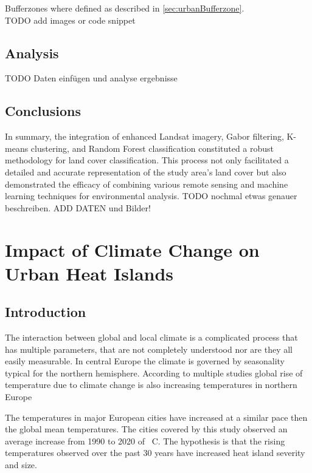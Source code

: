 \documentclass[12pt,a4paper, english,twoside]{article}
\begin{document}
    Bufferzones where defined as described in \cref{sec:urbanBufferzone}. \\
    TODO add images or code snippet



 \subsection{Analysis}\label{sec:landcoverAnalysis}
TODO Daten einfügen und analyse ergebnisse
  \subsection{Conclusions}
In summary, the integration of enhanced Landsat imagery, Gabor filtering, K-means clustering, and Random Forest classification constituted a robust methodology for land cover classification.
This process not only facilitated a detailed and accurate representation of the study area's land cover but also demonstrated the efficacy of combining various remote sensing and machine learning techniques for environmental analysis.
TODO nochmal etwas genauer beschreiben. ADD DATEN und Bilder! 
%
\newpage
  \section{Impact of Climate Change on Urban Heat Islands}\label{sec:UHITempImp}
    \subsection{Introduction}
    The interaction between global and local climate is a complicated process that has multiple parameters, that are not completely understood nor are they all easily measurable. 
    In central Europe the climate is governed by seasonality typical for the northern hemisphere.  
    According to multiple studies global rise of temperature due to climate change is also increasing temperatures in northern Europe~\cite{Benestad2005}  %

    The temperatures in major European cities have increased at a similar pace then the global mean temperatures. 
    The cities covered by this study observed an average increase from 1990 to 2020 of %
    \textdegree\ C. 
%
    The hypothesis is that the rising temperatures observed over the past 30 years have increased heat island severity and size. 
\end{document}
